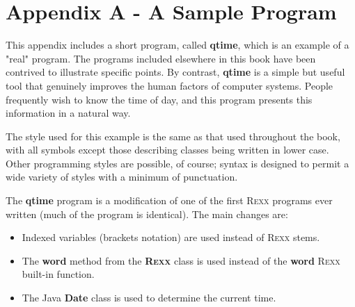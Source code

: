 \chapter{Appendix A - A Sample \nr{} Program}\label{refappa}
 
This appendix includes a short program, called \textbf{qtime}, which
is an example of a "real" \nr{} program.  The programs included
elsewhere in this book have been contrived to illustrate specific
points.  By contrast, \textbf{qtime} is a simple but useful tool that
genuinely improves the human factors of computer systems.  People
frequently wish to know the time of day, and this program presents this
information in a natural way.
 
The style used for this example is the same as that used throughout
the
book,
with all symbols except those describing classes being written
in lower case.  Other \nr{} programming styles are possible, of
course; \nr{} syntax is designed to permit a wide variety of styles
with a minimum of punctuation.
 
The \textbf{qtime} program is a modification of one of the first R\textsc{exx}
programs ever written (much of the program is identical).  The main
changes are:
\begin{itemize}
\item Indexed variables (brackets notation) are used instead of R\textsc{exx}
stems.
\item The \textbf{word} method from the \textbf{R\textsc{exx}} class is used
instead of the \textbf{word} R\textsc{exx} built-in function.
\item The Java \textbf{Date} class is used to determine the current
time.
\end{itemize}
 
